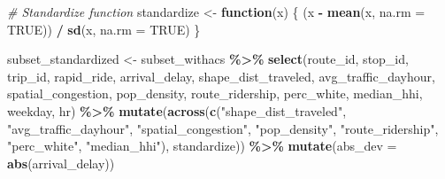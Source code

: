 \documentclass[
  12pt,
]{article}
\newenvironment{Shaded}{\begin{snugshade}}{\end{snugshade}}
\newcommand{\AttributeTok}[1]{\textcolor[rgb]{0.13,0.29,0.53}{#1}}
\newcommand{\CommentTok}[1]{\textcolor[rgb]{0.56,0.35,0.01}{\textit{#1}}}
\newcommand{\ConstantTok}[1]{\textcolor[rgb]{0.56,0.35,0.01}{#1}}
\newcommand{\ControlFlowTok}[1]{\textcolor[rgb]{0.13,0.29,0.53}{\textbf{#1}}}
\newcommand{\FunctionTok}[1]{\textcolor[rgb]{0.13,0.29,0.53}{\textbf{#1}}}
\newcommand{\NormalTok}[1]{#1}
\newcommand{\OtherTok}[1]{\textcolor[rgb]{0.56,0.35,0.01}{#1}}
\newcommand{\SpecialCharTok}[1]{\textcolor[rgb]{0.81,0.36,0.00}{\textbf{#1}}}
\newcommand{\StringTok}[1]{\textcolor[rgb]{0.31,0.60,0.02}{#1}}
\begin{document}
\begin{Shaded}
\begin{Highlighting}[]
\CommentTok{\# Standardize function}
\NormalTok{standardize }\OtherTok{\textless{}{-}} \ControlFlowTok{function}\NormalTok{(x) \{}
\NormalTok{  (x }\SpecialCharTok{{-}} \FunctionTok{mean}\NormalTok{(x, }\AttributeTok{na.rm =} \ConstantTok{TRUE}\NormalTok{)) }\SpecialCharTok{/} \FunctionTok{sd}\NormalTok{(x, }\AttributeTok{na.rm =} \ConstantTok{TRUE}\NormalTok{)}
\NormalTok{\}}

\NormalTok{subset\_standardized }\OtherTok{\textless{}{-}}\NormalTok{ subset\_withacs }\SpecialCharTok{\%\textgreater{}\%}
  \FunctionTok{select}\NormalTok{(route\_id, }
\NormalTok{         stop\_id, }
\NormalTok{         trip\_id, }
\NormalTok{         rapid\_ride, }
\NormalTok{         arrival\_delay, }
\NormalTok{         shape\_dist\_traveled, }
\NormalTok{         avg\_traffic\_dayhour, }
\NormalTok{         spatial\_congestion,}
\NormalTok{         pop\_density,}
\NormalTok{         route\_ridership,}
\NormalTok{         perc\_white,}
\NormalTok{         median\_hhi,}
\NormalTok{         weekday, }
\NormalTok{         hr) }\SpecialCharTok{\%\textgreater{}\%}
  \FunctionTok{mutate}\NormalTok{(}\FunctionTok{across}\NormalTok{(}\FunctionTok{c}\NormalTok{(}\StringTok{"shape\_dist\_traveled"}\NormalTok{, }
                  \StringTok{"avg\_traffic\_dayhour"}\NormalTok{, }
                  \StringTok{"spatial\_congestion"}\NormalTok{,}
                  \StringTok{"pop\_density"}\NormalTok{,}
                  \StringTok{"route\_ridership"}\NormalTok{,}
                  \StringTok{"perc\_white"}\NormalTok{,}
                  \StringTok{"median\_hhi"}\NormalTok{),}
\NormalTok{                standardize)) }\SpecialCharTok{\%\textgreater{}\%}
  \FunctionTok{mutate}\NormalTok{(}\AttributeTok{abs\_dev =} \FunctionTok{abs}\NormalTok{(arrival\_delay))}
\end{Highlighting}
\end{Shaded}
\end{document}
